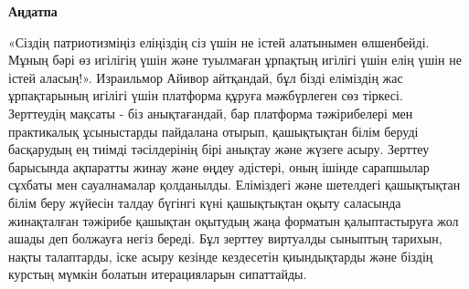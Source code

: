 \newpage
\pagestyle{plain}

{
\begin{center}
    \Large
    \textbf{Аңдатпа}
\end{center}
\par «Сіздің патриотизміңіз еліңіздің сіз үшін не істей алатынымен өлшенбейді. Мұның бәрі өз игілігің үшін және туылмаған ұрпақтың игілігі үшін елің үшін не істей аласың!». Израильмор Айивор айтқандай, бұл бізді еліміздің жас ұрпақтарының игілігі үшін платформа құруға мәжбүрлеген сөз тіркесі. \\
Зерттеудің мақсаты - біз анықтағандай, бар платформа тәжірибелері мен практикалық ұсыныстарды пайдалана отырып, қашықтықтан білім беруді басқарудың ең тиімді тәсілдерінің бірі \parencite{song2004improving} анықтау және жүзеге асыру. Зерттеу барысында ақпаратты жинау және өңдеу әдістері, оның ішінде сарапшылар сұхбаты мен сауалнамалар қолданылды. Еліміздегі және шетелдегі қашықтықтан білім беру жүйесін талдау бүгінгі күні қашықтықтан оқыту саласында жинақталған тәжірибе қашықтан оқытудың жаңа форматын қалыптастыруға жол ашады деп болжауға негіз береді.\parencite{khan2011let}
Бұл зерттеу виртуалды сыныптың тарихын, нақты талаптарды, іске асыру кезінде кездесетін қиындықтарды және біздің курстың мүмкін болатын итерацияларын сипаттайды.
}
